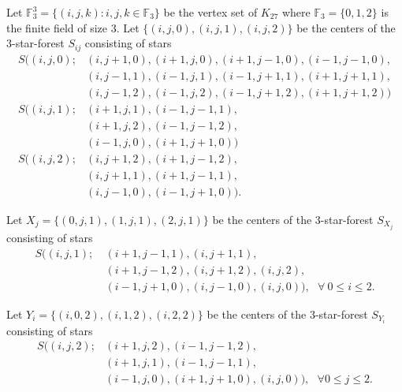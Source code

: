 \documentclass{article}
\begin{document}
Let $\mathbb{F}^3_3=\{(i,j,k):i,j,k\in\mathbb{F}_3\}$ be the vertex set of $K_{27}$ where $\mathbb{F}_3=\{0,1,2\}$ is the finite field of size 3. Let $\{(i,j,0),(i,j,1),(i,j,2)\}$ be the centers of the 3-star-forest $S_{ij}$ consisting of stars
\begin{align*}
		S ((i,j,0); &(i,j+1,0),(i+1,j,0),(i+1,j-1,0),(i-1,j-1,0),\\
		&(i,j-1,1),(i-1,j,1),(i-1,j+1,1),(i+1,j+1,1),\\
            &(i,j-1,2), (i-1,j,2), (i-1,j+1,2), (i+1,j+1,2) )\\
S ((i,j,1); &(i+1,j,1), (i-1,j-1,1),\\
&(i+1,j,2), (i-1,j-1,2),\\
&(i-1,j,0), (i+1,j+1,0) )\\
S ((i,j,2); &(i,j+1,2), (i+1,j-1,2),\\
&(i,j+1,1), (i+1,j-1,1),\\
&(i,j-1,0), (i-1,j+1,0)).
\end{align*}

Let $X_j=\{(0,j,1), (1,j,1), (2,j,1)\}$ be the centers of the 3-star-forest $S_{X_j}$ consisting of stars
\begin{align*}
	S ((i,j,1);~ &(i+1,j-1,1), (i,j+1,1),\\
	&(i+1,j-1,2), (i,j+1,2), (i,j,2),\\
	&(i-1,j+1,0), (i,j-1,0), (i,j,0) ),~~~\forall~ 0\le i\le 2.
\end{align*}


	
Let $Y_i=\{(i,0,2),(i,1,2),(i,2,2)\}$ be the centers of the 3-star-forest $S_{Y_i}$ consisting of stars
\begin{align*}
		S ((i,j,2); &(i+1,j,2),(i-1,j-1,2),\\
		&(i+1,j,1),(i-1,j-1,1),\\
		&(i-1,j,0),(i+1,j+1,0),(i,j,0) ),~~~\forall 0\le j\le 2.
\end{align*}
\end{document}
